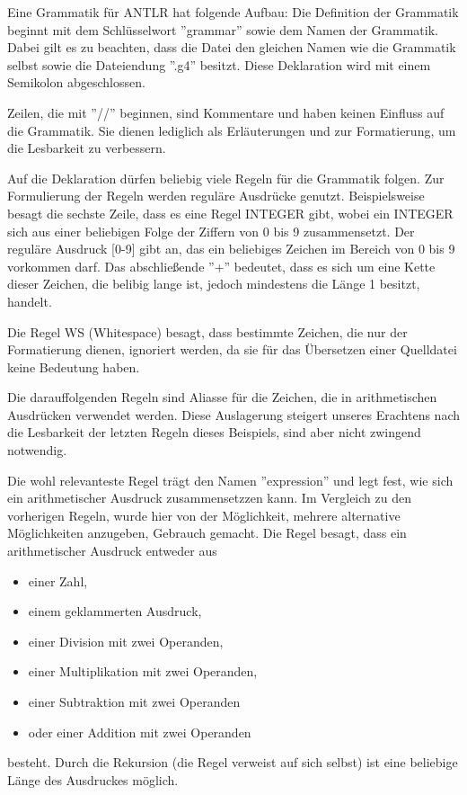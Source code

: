 \documentclass[12pt, a4paper, oneside, ngerman]{article}
\begin{document}
Eine Grammatik für ANTLR hat folgende Aufbau:
Die Definition der Grammatik beginnt mit dem Schlüsselwort ''grammar'' sowie dem Namen der Grammatik. Dabei gilt es zu beachten, dass die Datei den gleichen Namen wie die Grammatik selbst sowie die Dateiendung ''.g4'' besitzt. Diese Deklaration wird mit einem Semikolon abgeschlossen.

Zeilen, die mit ''//'' beginnen, sind Kommentare und haben keinen Einfluss auf die Grammatik. Sie dienen lediglich als Erläuterungen und zur Formatierung, um die Lesbarkeit zu verbessern.

Auf die Deklaration dürfen beliebig viele Regeln für die Grammatik folgen. Zur Formulierung der Regeln werden reguläre Ausdrücke genutzt. Beispielsweise besagt die sechste Zeile, dass es eine Regel INTEGER gibt, wobei ein INTEGER sich aus einer beliebigen Folge der Ziffern von 0 bis 9 zusammensetzt. Der reguläre Ausdruck [0-9] gibt an, das ein beliebiges Zeichen im Bereich von 0 bis 9 vorkommen darf. Das abschließende ''+'' bedeutet, dass es sich um eine Kette dieser Zeichen, die belibig lange ist, jedoch mindestens die Länge 1 besitzt, handelt.

Die Regel WS (Whitespace) besagt, dass bestimmte Zeichen, die nur der Formatierung dienen, ignoriert werden, da sie für das Übersetzen einer Quelldatei keine Bedeutung haben.

Die darauffolgenden Regeln sind Aliasse für die Zeichen, die in arithmetischen Ausdrücken verwendet werden. Diese Auslagerung steigert unseres Erachtens nach die Lesbarkeit der letzten Regeln dieses Beispiels, sind aber nicht zwingend notwendig.

Die wohl relevanteste Regel trägt den Namen ''expression'' und legt fest, wie sich ein arithmetischer Ausdruck zusammensetzzen kann. Im Vergleich zu den vorherigen Regeln, wurde hier von der Möglichkeit, mehrere alternative Möglichkeiten anzugeben, Gebrauch gemacht. Die Regel besagt, dass ein arithmetischer Ausdruck entweder aus 
\begin{itemize}
\item einer Zahl,
\item einem geklammerten Ausdruck,
\item einer Division mit zwei Operanden,
\item einer Multiplikation mit zwei Operanden,
\item einer Subtraktion mit zwei Operanden
\item oder einer Addition mit zwei Operanden
\end{itemize}
besteht.
Durch die Rekursion (die Regel verweist auf sich selbst) ist eine beliebige Länge des Ausdruckes möglich.
\end{document}
